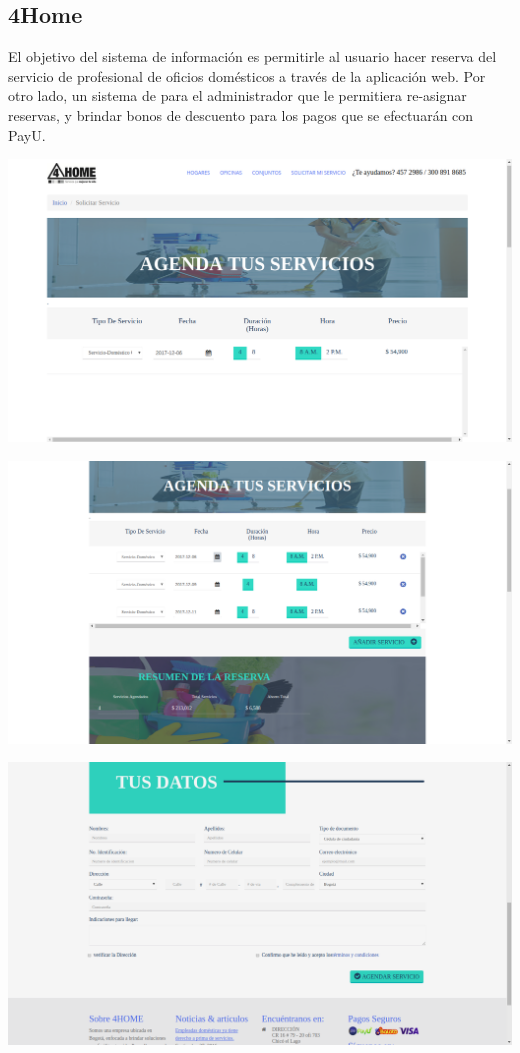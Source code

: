 \documentclass[letterpaper]{twentysecondcv} %
\begin{document}
\subsection{4Home}
\begin{flushleft}
El objetivo del sistema de información es permitirle al usuario hacer reserva del servicio de profesional de oficios domésticos a través de la aplicación web. Por otro lado, un sistema de para el administrador que le permitiera re-asignar reservas, y brindar bonos de descuento para los pagos que se efectuarán con PayU.
\end{flushleft}
\begin{center}
\includegraphics[width=.9\textwidth]{img/4home1.png}
\end{center}
\vspace{1cm}
\begin{center}
\includegraphics[width=.9\textwidth]{img/4home2.png}
\end{center}

\newpage
\makesidebarcommon %
\begin{center}
\includegraphics[width=.9\textwidth]{img/4home3.png} 
\end{center}
\end{document}
